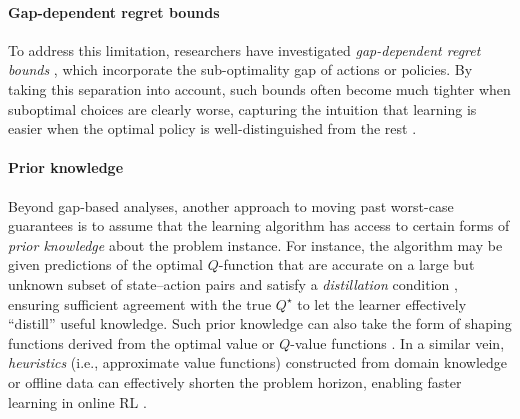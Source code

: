 \documentclass[twoside]{article}
\begin{document}


\paragraph{Gap-dependent regret bounds}
To address this limitation, researchers have investigated \emph{gap-dependent regret bounds} \citep{simchowitz2019non,zanette2019tighter}, which incorporate the sub-optimality gap of actions or policies. By taking this separation into account, such bounds often become much tighter when suboptimal choices are clearly worse, capturing the intuition that learning is easier when the optimal policy is well-distinguished from the rest \citep{dann2021beyond,lykouris2021corruption}.


\paragraph{Prior knowledge}
Beyond gap-based analyses, another approach to moving past worst-case guarantees is to assume that the learning algorithm has access to certain forms of \emph{prior knowledge} about the problem instance. For instance, the algorithm may be given predictions of the optimal $Q$-function that are accurate on a large but unknown subset of state–action pairs and satisfy a \emph{distillation} condition \citep{golowich2022can}, ensuring sufficient agreement with the true $Q^\star$ to let the learner effectively “distill” useful knowledge. Such prior knowledge can also take the form of shaping functions derived from the optimal value or $Q$-value functions \citep{gupta_unpacking_2022}. In a similar vein, \emph{heuristics} \citep{kolobov2012planning} (i.e., approximate value functions) constructed from domain knowledge or offline data can effectively shorten the problem horizon, enabling faster learning in online RL \citep{cheng2021heuristic}.
\end{document}
